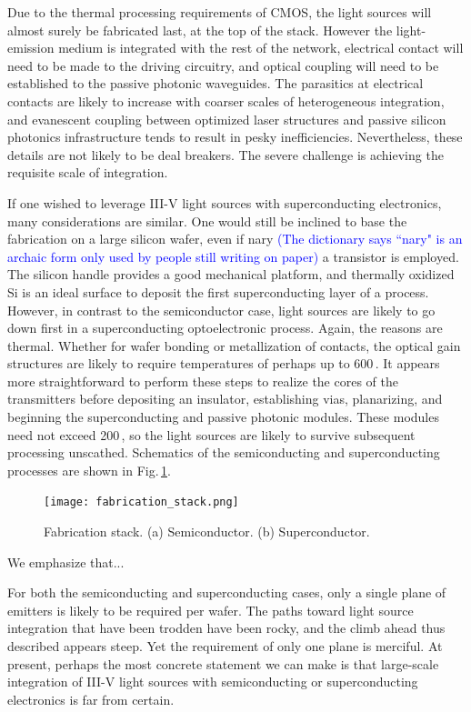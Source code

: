 \documentclass[twocolumn]{article}
\begin{document}
Due to the thermal processing requirements of CMOS, the light sources will almost surely be fabricated last, at the top of the stack. However the light-emission medium is integrated with the rest of the network, electrical contact will need to be made to the driving circuitry, and optical coupling will need to be established to the passive photonic waveguides. The parasitics at electrical contacts are likely to increase with coarser scales of heterogeneous integration, and evanescent coupling between optimized laser structures and passive silicon photonics infrastructure tends to result in pesky inefficiencies. Nevertheless, these details are not likely to be deal breakers. The severe challenge is achieving the requisite scale of integration.

If one wished to leverage III-V light sources with superconducting electronics, many considerations are similar. One would still be inclined to base the fabrication on a large silicon wafer, even if nary \textcolor{blue}{(The dictionary says ``nary" is an archaic form only used by people still writing on paper)} a transistor is employed. The silicon handle provides a good mechanical platform, and thermally oxidized Si is an ideal surface to deposit the first superconducting layer of a process. However, in contrast to the semiconductor case, light sources are likely to go down first in a superconducting optoelectronic process. Again, the reasons are thermal. Whether for wafer bonding or metallization of contacts, the optical gain structures are likely to require temperatures of perhaps up to 600\,\textcelsius. It appears more straightforward to perform these steps to realize the cores of the transmitters before depositing an insulator, establishing vias, planarizing, and beginning the superconducting and passive photonic modules. These modules need not exceed 200\,\textcelsius, so the light sources are likely to survive subsequent processing unscathed. Schematics of the semiconducting and superconducting processes are shown in Fig.\,\ref{fig:fabrication_stack}.
\begin{figure}
    \centering
    \texttt{[image: fabrication\_stack.png]}
    \caption{Fabrication stack. (a) Semiconductor. (b) Superconductor.}
    \label{fig:fabrication_stack}
\end{figure}
We emphasize that...

For both the semiconducting and superconducting cases, only a single plane of emitters is likely to be required per wafer. The paths toward light source integration that have been trodden have been rocky, and the climb ahead thus described appears steep. Yet the requirement of only one plane is merciful. At present, perhaps the most concrete statement we can make is that large-scale integration of III-V light sources with semiconducting or superconducting electronics is far from certain. 
\end{document}
